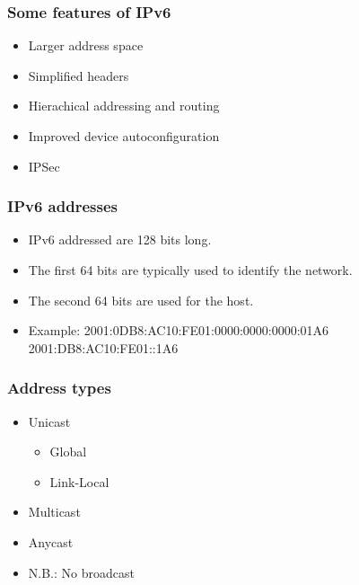 \documentclass[10pt]{beamer}
\begin{document}
\begin{frame}
  \frametitle{Some features of IPv6}

 \begin{itemize}
  \item Larger address space
  \item Simplified headers
  \item Hierachical addressing and routing
  \item Improved device autoconfiguration
  \item IPSec
 \end{itemize}

\end{frame}


\begin{frame}
  \frametitle{IPv6 addresses}

 \begin{itemize}
  \item IPv6 addressed are 128 bits long.
  \item The first 64 bits are typically used to identify the network.
  \item The second 64 bits are used for the host.
  \item Example:
        2001:0DB8:AC10:FE01:0000:0000:0000:01A6 \\
        \hspace{15mm}2001:DB8:AC10:FE01::1A6
 \end{itemize}


\end{frame}


\begin{frame}
  \frametitle{Address types}

 \begin{itemize}
  \item Unicast
        \begin{itemize}
          \item Global
          \item Link-Local
        \end{itemize}
  \item Multicast
  \item Anycast
  \item N.B.: No broadcast 
 \end{itemize}

\end{frame}
\end{document}
